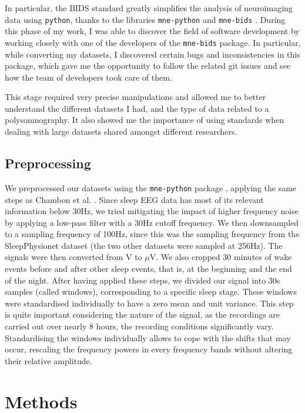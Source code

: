 \documentclass[titlepage, 11pt, a4paper, fancysections]{article}
\begin{document}
In particular, the BIDS standard greatly simplifies the analysis of neuroimaging data using \texttt{python}, thanks to the libraries \texttt{mne-python} \autocite{mne-python} and \texttt{mne-bids} \autocite{mne-bids}. During this phase of my work, I was able to discover the field of software development by working closely with one of the developers of the \texttt{mne-bids} package. In particular, while converting my datasets, I discovered certain bugs and inconsistencies in this package, which gave me the opportunity to follow the related git issues and see how the team of developers took care of them. 

This stage required very precise manipulations and allowed me to better understand the different datasets I had, and the type of data related to a polysomnography. It also showed me the importance of using standards when dealing with large datasets shared amongst different researchers. 


\subsection{Preprocessing}
We preprocessed our datasets using the \texttt{mne-python} package \autocite{mne-python}, applying the same steps as Chambon et al. \autocite{chambon-sleep-scoring}. Since sleep EEG data has most of its relevant information below 30Hz, we tried mitigating the impact of higher frequency noise by applying a low-pass filter with a 30Hz cutoff frequency. We then downsampled to a sampling frequency of 100Hz, since this was the sampling frequency from the SleepPhysionet dataset (the two other datasets were sampled at 256Hz). The signals were then converted from V to $\mu$V. We also cropped 30 minutes of wake events before and after other sleep events, that is, at the beginning and the end of the night. After having applied these steps, we divided our signal into 30s samples (called windows), corresponding to a specific sleep stage. These windows were standardised individually to have a zero mean and unit variance. This step is quite important considering the nature of the signal, as the recordings are carried out over nearly 8 hours, the recording conditions significantly vary.  Standardising the windows individually allows to cope with the shifts that may occur, rescaling the frequency powers in every frequency bands without altering their relative amplitude. 

\newpage
\section{Methods}
\label{section:methods}
\end{document}
